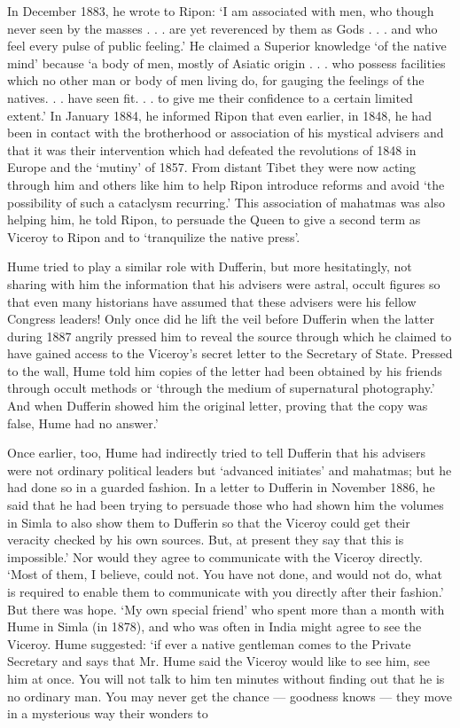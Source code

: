 In December 1883, he wrote to Ripon: ‘I am associated with men, who though never seen by the masses . . . are yet reverenced by them as Gods . . . and who feel every pulse of public feeling.’ He claimed a Superior knowledge ‘of the native mind’ because ‘a body of men, mostly of Asiatic origin . . . who possess facilities which no other man or body of men living do, for gauging the feelings of the natives. . . have seen fit. . . to give me their confidence to a certain limited extent.’ In January 1884, he informed Ripon that even earlier, in 1848, he had been in contact with the brotherhood or association of his mystical advisers and that it was their intervention which had defeated the revolutions of 1848 in Europe and the ‘mutiny’ of 1857. From distant Tibet they were now acting through him and others like him to help Ripon introduce reforms and avoid ‘the possibility of such a cataclysm recurring.’ This association of mahatmas was also helping him, he told Ripon, to persuade the Queen to give a second term as Viceroy to Ripon and to `tranquilize the native press'.

Hume tried to play a similar role with Dufferin, but more hesitatingly, not sharing with him the information that his advisers were astral, occult figures so that even many historians have assumed that these advisers were his fellow Congress leaders! Only once did he lift the veil before Dufferin when the latter during 1887 angrily pressed him to reveal the source through which he claimed to have gained access to the Viceroy’s secret letter to the Secretary of State. Pressed to the wall, Hume told him copies of the letter had been obtained by his friends through occult methods or ‘through the medium of supernatural photography.’ And when Dufferin showed him the original letter, proving that the copy was false, Hume had no answer.’

Once earlier, too, Hume had indirectly tried to tell Dufferin that his advisers were not ordinary political leaders but ‘advanced initiates’ and mahatmas; but he had done so in a guarded fashion. In a letter to Dufferin in November 1886, he said that he had been trying to persuade those who had shown him the volumes in Simla to also show them to Dufferin so that the Viceroy could get their veracity checked by his own sources. But, at present they say that this is impossible.’ Nor would they agree to communicate with the Viceroy directly. ‘Most of them, I believe, could not. You have not done, and would not do, what is required to enable them to communicate with you directly after their fashion.’ But there was hope. ‘My own special friend’ who spent more than a month with Hume in Simla (in 1878), and who was often in India might agree to see the Viceroy. Hume suggested: ‘if ever a native gentleman comes to the Private Secretary and says that Mr. Hume said the Viceroy would like to see him, see him at once. You will not talk to him ten minutes without finding out that he is no ordinary man. You may never get the chance — goodness knows — they move in a mysterious way their wonders to

